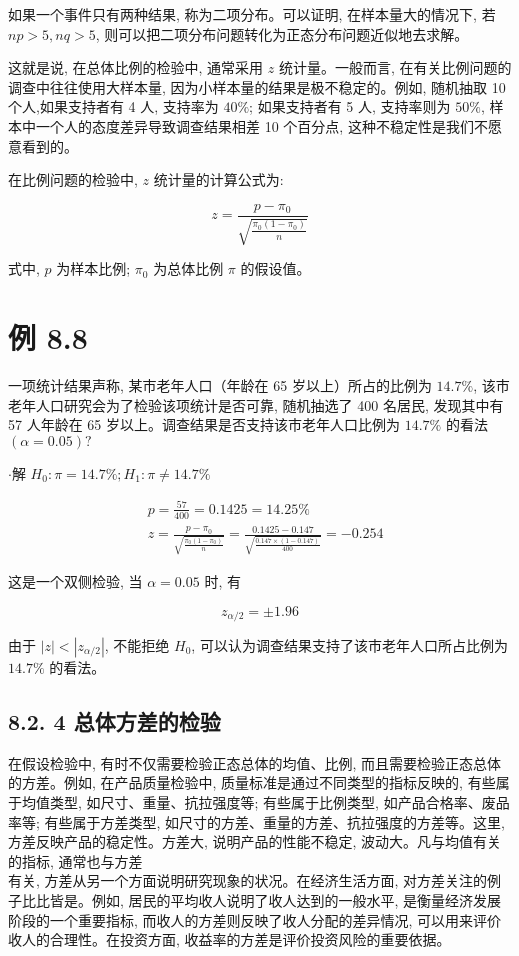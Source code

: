 \documentclass[10pt]{article}
\begin{document}
\begin{CJK*}{UTF8}{bsmi}
如果一个事件只有两种结果, 称为二项分布。可以证明, 在样本量大的情况下, 若 $n p>5, n q>5$, 则可以把二项分布问题转化为正态分布问题近似地去求解。

这就是说, 在总体比例的检验中, 通常采用 $z$ 统计量。一般而言, 在有关比例问题的调查中往往使用大样本量, 因为小样本量的结果是极不稳定的。例如, 随机抽取 10 个人,如果支持者有 4 人, 支持率为 $40 \%$; 如果支持者有 5 人, 支持率则为 $50 \%$, 样本中一个人的态度差异导致调查结果相差 10 个百分点, 这种不稳定性是我们不愿意看到的。

在比例问题的检验中, $z$ 统计量的计算公式为:


\begin{equation*}
z=\frac{p-\pi_{0}}{\sqrt{\frac{\pi_{0}\left(1-\pi_{0}\right)}{n}}} \tag{8.3}
\end{equation*}


式中, $p$ 为样本比例; $\pi_{0}$ 为总体比例 $\pi$ 的假设值。

\section*{例 8.8}
一项统计结果声称, 某市老年人口（年龄在 65 岁以上）所占的比例为 $14.7 \%$, 该市老年人口研究会为了检验该项统计是否可靠, 随机抽选了 400 名居民, 发现其中有 57 人年龄在 65 岁以上。调查结果是否支持该市老年人口比例为 $14.7 \%$ 的看法 $(\alpha=0.05) ?$

$\cdot$解 $H_{0}: \pi=14.7 \% ; H_{1}: \pi \neq 14.7 \%$

$$
\begin{aligned}
& p=\frac{57}{400}=0.1425=14.25 \% \\
& z=\frac{p-\pi_{0}}{\sqrt{\frac{\pi_{0}\left(1-\pi_{0}\right)}{n}}}=\frac{0.1425-0.147}{\sqrt{\frac{0.147 \times(1-0.147)}{400}}}=-0.254
\end{aligned}
$$

这是一个双侧检验, 当 $\alpha=0.05$ 时, 有

$$
z_{\alpha / 2}= \pm 1.96
$$

由于 $|z|<\left|z_{\alpha / 2}\right|$, 不能拒绝 $H_{0}$, 可以认为调查结果支持了该市老年人口所占比例为 $14.7 \%$ 的看法。

\subsection*{8.2. 4 总体方差的检验}
在假设检验中, 有时不仅需要检验正态总体的均值、比例, 而且需要检验正态总体的方差。例如, 在产品质量检验中, 质量标准是通过不同类型的指标反映的, 有些属于均值类型, 如尺寸、重量、抗拉强度等; 有些属于比例类型, 如产品合格率、废品率等; 有些属于方差类型, 如尺寸的方差、重量的方差、抗拉强度的方差等。这里, 方差反映产品的稳定性。方差大, 说明产品的性能不稳定, 波动大。凡与均值有关的指标, 通常也与方差\\
有关, 方差从另一个方面说明研究现象的状况。在经济生活方面, 对方差关注的例子比比皆是。例如, 居民的平均收人说明了收人达到的一般水平, 是衡量经济发展阶段的一个重要指标, 而收人的方差则反映了收人分配的差异情况, 可以用来评价收人的合理性。在投资方面, 收益率的方差是评价投资风险的重要依据。


\end{CJK*}
\end{document}

